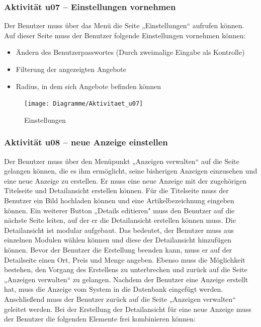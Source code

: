 \documentclass[a4paper,12pt,oneside]{scrartcl}
\begin{document}
\subsubsection{Aktivität u07 – Einstellungen vornehmen}
Der Benutzer muss über das Menü die Seite „Einstellungen“ aufrufen können.
Auf dieser Seite muss der Benutzer folgende Einstellungen vornehmen können:
\begin{itemize}
	\item Ändern des Benutzerpasswortes (Durch zweimalige Eingabe als Kontrolle)
	\item Filterung der angezeigten Angebote
	\item Radius, in dem sich Angebote befinden können
\end{itemize}

\begin{figure}[!htbp]
\centering
\noindent\texttt{[image: Diagramme/Aktivitaet\_u07]}
\caption{Einstellungen}
\end{figure}
\FloatBarrier


\hypertarget{u08}{\subsubsection{Aktivität u08 – neue Anzeige einstellen}}
Der Benutzer muss über den Menüpunkt „Anzeigen verwalten“ auf die Seite gelangen können, die es ihm ermöglicht, seine bisherigen Anzeigen einzusehen und eine neue Anzeige zu erstellen. 
Er muss eine neue Anzeige mit der zugehörigen Titelseite und Detailansicht erstellen können.
Für die Titelseite muss der Benutzer ein Bild hochladen können und eine Artikelbezeichnung eingeben können. 
Ein weiterer Button „Details editieren" muss den Benutzer auf die nächste Seite leiten, auf der er die Detailansicht erstellen können muss. 
Die Detailansicht ist modular aufgebaut. Das bedeutet, der Benutzer muss aus einzelnen Modulen wählen können und diese der Detailansicht hinzufügen können.
Bevor der Benutzer die Erstellung beenden kann, muss er auf der Detailseite einen Ort, Preis und Menge angeben.
Ebenso muss die Möglichkeit bestehen, den Vorgang des Erstellens zu unterbrechen und zurück auf die Seite „Anzeigen verwalten“ zu gelangen.
Nachdem der Benutzer eine Anzeige erstellt hat, muss die Anzeige vom System in die Datenbank eingefügt werden.
Anschließend muss der Benutzer zurück auf die Seite „Anzeigen verwalten“ geleitet werden. 
Bei der Erstellung der Detailansicht für eine neue Anzeige muss der Benutzer die folgenden Elemente frei kombinieren können:
\end{document}
